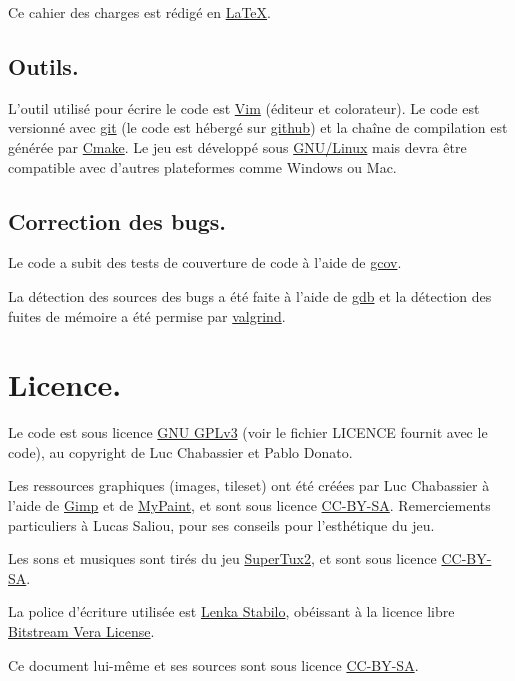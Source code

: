 \documentclass{article}
\begin{document}
Ce cahier des charges est rédigé en \href{http://www.latex-project.org/}{\LaTeX}.

\subsection{Outils.}
L'outil utilisé pour écrire le code est \href{http://www.vim.org/}{Vim} (éditeur et colorateur). Le code est versionné avec \href{http://git-scm.com/}{git} (le code est hébergé sur \href{https://github.com/Lycee/ISN\_snake}{github}) et la chaîne de compilation est générée par \href{http://www.cmake.org/}{Cmake}. Le jeu est développé sous \href{https://en.wikipedia.org/wiki/Linux}{GNU/Linux} mais devra être compatible avec d'autres plateformes comme Windows ou Mac.

\subsection{Correction des bugs.}
Le code a subit des tests de couverture de code à l'aide de \href{http://gcc.gnu.org/onlinedocs/gcc-4.5.2/gcc/Gcov.html#Gcov}{gcov}.

La détection des sources des bugs a été faite à l'aide de \href{https://www.gnu.org/software/gdb/}{gdb} et la détection des fuites de mémoire a été permise par \href{http://www.valgrind.org/}{valgrind}.

\section{Licence.}
Le code est sous licence \href{http://gplv3.fsf.org/}{GNU GPLv3} (voir le fichier LICENCE fournit avec le code), au copyright de Luc Chabassier et Pablo Donato.

Les ressources graphiques (images, tileset) ont été créées par Luc Chabassier à l'aide de \href{http://www.gimp.org/}{Gimp} et de \href{http://mypaint.intilinux.com/}{MyPaint}, et sont sous licence \href{https://creativecommons.org/licenses/by-sa/2.0/}{CC-BY-SA}. Remerciements particuliers à Lucas Saliou, pour ses conseils pour l'esthétique du jeu.

Les sons et musiques sont tirés du jeu \href{http://supertux.lethargik.org/}{SuperTux2}, et sont sous licence \href{https://creativecommons.org/licenses/by-sa/2.0/}{CC-BY-SA}.

La police d'écriture utilisée est \href{http://openfontlibrary.org/en/font/lenka-stabilo}{Lenka Stabilo}, obéissant à la licence libre \href{http://www-old.gnome.org/fonts/}{Bitstream Vera License}.

Ce document lui-même et ses sources sont sous licence \href{https://creativecommons.org/licenses/by-sa/2.0/}{CC-BY-SA}.
\end{document}
